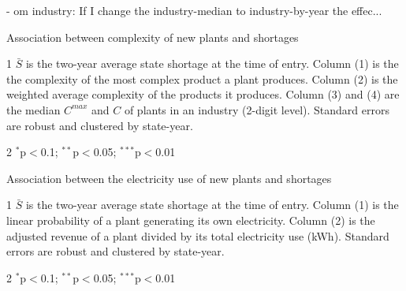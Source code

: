 \documentclass[11pt]{article}
\begin{document}
- om industry: If I change the industry-median to industry-by-year the effec...

\begin{table} 
	\begin{center}
		\begin{threeparttable}
			\caption{Association between complexity of new plants and shortages}
			\label{tab:plant_entry_pci}
			
			\begin{tablenotes} \footnotesize
			\item[1] $\bar{S}$ is the two-year average state shortage at the time of entry. Column (1) is the the complexity of the most complex product a plant produces. Column (2) is the weighted average complexity of the products it produces. Column (3) and (4) are the median $C^{max}$ and $C$ of plants in an industry (2-digit level). Standard errors are robust and clustered by state-year.
		\item[2] $^{*}$p$<$0.1; $^{**}$p$<$0.05; $^{***}$p$<$0.01 \\
			\end{tablenotes}
		\end{threeparttable}
	\end{center}
\end{table}   



\begin{table} 
	\begin{center}
		\begin{threeparttable}
			\caption{Association between the electricity use of new plants and shortages}
			\label{tab:plant_entry_electricity}
			
			\begin{tablenotes} \footnotesize
			\item[1] $\bar{S}$ is the two-year average state shortage at the time of entry. Column (1) is the linear probability of a plant generating its own electricity. Column (2) is the adjusted revenue of a plant divided by its total electricity use (kWh). Standard errors are robust and clustered by state-year. 

       	\item[2] $^{*}$p$<$0.1; $^{**}$p$<$0.05; $^{***}$p$<$0.01 \\
			\end{tablenotes}
		\end{threeparttable}
	\end{center}
\end{table}   
\end{document}
